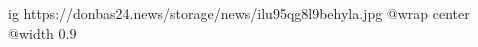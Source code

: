  
 
 
 
 

\ifcmt
  ig https://donbas24.news/storage/news/ilu95qg8l9behyla.jpg
  @wrap center
  @width 0.9
\fi
